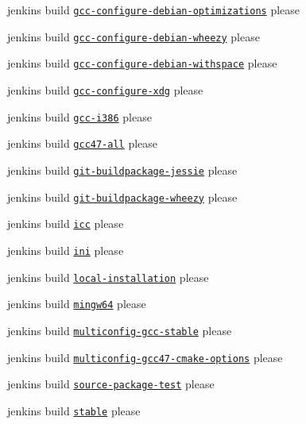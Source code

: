 \begin{DoxyItemize}
\item jenkins build \href{https://build.libelektra.org/job/elektra-gcc-configure-debian-optimizations/}{\tt gcc-\/configure-\/debian-\/optimizations} please
\item jenkins build \href{https://build.libelektra.org/job/elektra-gcc-configure-debian-wheezy/}{\tt gcc-\/configure-\/debian-\/wheezy} please
\item jenkins build \href{https://build.libelektra.org/job/elektra-gcc-configure-debian-withspace/}{\tt gcc-\/configure-\/debian-\/withspace} please
\item jenkins build \href{https://build.libelektra.org/job/elektra-gcc-configure-xdg/}{\tt gcc-\/configure-\/xdg} please
\item jenkins build \href{https://build.libelektra.org/job/elektra-gcc-i386/}{\tt gcc-\/i386} please
\item jenkins build \href{https://build.libelektra.org/job/elektra-gcc47-all/}{\tt gcc47-\/all} please
\item jenkins build \href{https://build.libelektra.org/job/elektra-git-buildpackage-jessie/}{\tt git-\/buildpackage-\/jessie} please
\item jenkins build \href{https://build.libelektra.org/job/elektra-git-buildpackage-wheezy/}{\tt git-\/buildpackage-\/wheezy} please
\item jenkins build \href{https://build.libelektra.org/job/elektra-icc/}{\tt icc} please
\item jenkins build \href{https://build.libelektra.org/job/elektra-ini-mergerequests/}{\tt ini} please
\item jenkins build \href{https://build.libelektra.org/job/elektra-local-installation/}{\tt local-\/installation} please
\item jenkins build \href{https://build.libelektra.org/job/elektra-gcc-configure-mingw-w64/}{\tt mingw64} please
\item jenkins build \href{https://build.libelektra.org/job/elektra-multiconfig-gcc-stable/}{\tt multiconfig-\/gcc-\/stable} please
\item jenkins build \href{https://build.libelektra.org/job/elektra-multiconfig-gcc47-cmake-options/}{\tt multiconfig-\/gcc47-\/cmake-\/options} please
\item jenkins build \href{https://build.libelektra.org/job/elektra-source-package-test/}{\tt source-\/package-\/test} please
\item jenkins build \href{https://build.libelektra.org/job/elektra-mergerequests-stable/}{\tt stable} please

\end{DoxyItemize}
